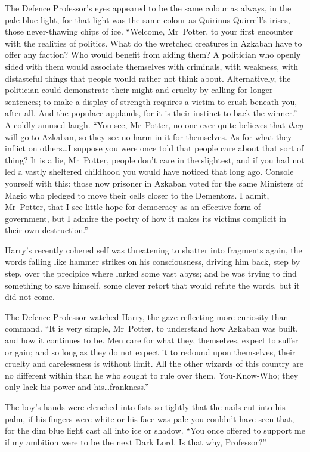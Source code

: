The Defence Professor’s eyes appeared to be the same colour as always, in the pale blue light, for that light was the same colour as Quirinus Quirrell’s irises, those never-thawing chips of ice.
“Welcome, Mr~Potter, to your first encounter with the realities of politics. What do the wretched creatures in Azkaban have to offer any faction? Who would benefit from aiding them? A politician who openly sided with them would associate themselves with criminals, with weakness, with distasteful things that people would rather not think about. Alternatively, the politician could demonstrate their might and cruelty by calling for longer sentences; to make a display of strength requires a victim to crush beneath you, after all. And the populace applauds, for it is their instinct to back the winner.” A coldly amused laugh.
“You see, Mr~Potter, no-one ever quite believes that \emph{they} will go to Azkaban, so they see no harm in it for themselves. As for what they inflict on others…I suppose you were once told that people care about that sort of thing? It is a lie, Mr~Potter, people don’t care in the slightest, and if you had not led a vastly sheltered childhood you would have noticed that long ago. Console yourself with this: those now prisoner in Azkaban voted for the same Ministers of Magic who pledged to move their cells closer to the Dementors. I admit, Mr~Potter, that I see little hope for democracy as an effective form of government, but I admire the poetry of how it makes its victims complicit in their own destruction.”

Harry’s recently cohered self was threatening to shatter into fragments again, the words falling like hammer strikes on his consciousness, driving him back, step by step, over the precipice where lurked some vast abyss; and he was trying to find something to save himself, some clever retort that would refute the words, but it did not come.

The Defence Professor watched Harry, the gaze reflecting more curiosity than command.
“It is very simple, Mr~Potter, to understand how Azkaban was built, and how it continues to be. Men care for what they, themselves, expect to suffer or gain; and so long as they do not expect it to redound upon themselves, their cruelty and carelessness is without limit. All the other wizards of this country are no different within than he who sought to rule over them, You-Know-Who; they only lack his power and his…frankness.”

The boy’s hands were clenched into fists so tightly that the nails cut into his palm, if his fingers were white or his face was pale you couldn’t have seen that, for the dim blue light cast all into ice or shadow.
“You once offered to support me if my ambition were to be the next Dark Lord. Is that why, Professor?”

